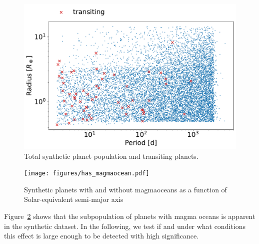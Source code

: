 \documentclass[modern]{aastex631}
\begin{document}
\begin{figure}
    \begin{centering}
        \includegraphics[width=\hsize]{figures/synthetic_population.pdf}
        \caption{Total synthetic planet population and transiting planets.}
        \label{fig:synthetic_population}
    \end{centering}
\end{figure}


\begin{figure}
    \begin{centering}
        \texttt{[image: figures/has\_magmaocean.pdf]}
        \caption{Synthetic planets with and without magmaoceans as a function of Solar-equivalent semi-major axis}
        \label{fig:has_magmaocean}
    \end{centering}
\end{figure}



\begin{note}
Figure~\ref{fig:has_magmaocean} shows that the subpopulation of planets with magma oceans is apparent in the synthetic dataset.
    In the following, we test if and under what conditions this effect is large enough to be detected with high significance.
\end{note}
\end{document}
